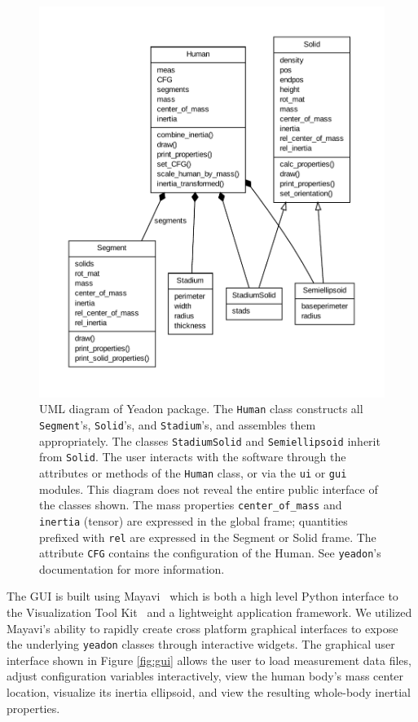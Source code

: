 \documentclass[10pt,a4paper,twocolumn]{article}
\begin{document}
\begin{figure}
  \begin{center}
    \includegraphics[width=\columnwidth]{figures/umldiagram.pdf}
  \end{center}
  \cprotect\caption{
    UML diagram of Yeadon package. The \verb+Human+ class constructs all
    \verb+Segment+'s, \verb+Solid+'s, and \verb+Stadium+'s, and assembles them
    appropriately. The classes \verb+StadiumSolid+ and \verb+Semiellipsoid+
    inherit from \verb+Solid+.  The user interacts with the software
    through the attributes or methods of the \verb+Human+ class, or via the
    \verb+ui+ or \verb+gui+ modules. This diagram does not reveal the entire
    public interface of the classes shown. The mass properties
    \verb+center_of_mass+ and \verb+inertia+ (tensor) are expressed in the
    global frame; quantities prefixed with \verb+rel+ are expressed in the
    Segment or Solid frame. The attribute \verb+CFG+ contains the configuration
    of the Human. See \verb+yeadon+'s documentation for more information.
  }
  \label{fig:umldiagram}
\end{figure}

The GUI is built using Mayavi~\cite{Ramachandran2011} which is both a high
level Python interface to the Visualization Tool Kit~\cite{Schroeder2006} and a
lightweight application framework. We utilized Mayavi's ability to rapidly
create cross platform graphical interfaces to expose the underlying
\verb+yeadon+ classes through interactive widgets. The graphical user interface
shown in Figure \ref{fig:gui} allows the user to load measurement data files,
adjust configuration variables interactively, view the human body's mass center
location, visualize its inertia ellipsoid, and view the resulting whole-body
inertial properties.
\end{document}
